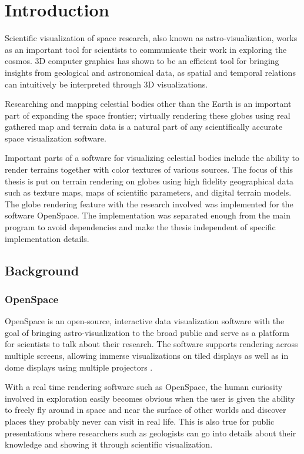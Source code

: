 \chapter{Introduction}

Scientific visualization of space research, also known as astro-visualization, works as an important tool for scientists to communicate their work in exploring the cosmos. 3D computer graphics has shown to be an efficient tool for bringing insights from geological and astronomical data, as spatial and temporal relations can intuitively be interpreted through 3D visualizations.

Researching and mapping celestial bodies other than the Earth is an important part of expanding the space frontier; virtually rendering these globes using real gathered map and terrain data is a natural part of any scientifically accurate space visualization software.

Important parts of a software for visualizing celestial bodies include the ability to render terrains together with color textures of various sources. The focus of this thesis is put on terrain rendering on globes using high fidelity geographical data such as texture maps, maps of scientific parameters, and digital terrain models. The globe rendering feature with the research involved was implemented for the software OpenSpace. The implementation was separated enough from the main program to avoid dependencies and make the thesis independent of specific implementation details. 

\section{Background}

\subsection{OpenSpace}

OpenSpace is an open-source, interactive data visualization software with the goal of bringing astro-visualization to the broad public and serve as a platform for scientists to talk about their research. The software supports rendering across multiple screens, allowing immerse visualizations on tiled displays as well as in dome displays using multiple projectors \cite{openspace}.

With a real time rendering software such as OpenSpace, the human curiosity involved in exploration easily becomes obvious when the user is given the ability to freely fly around in space and near the surface of other worlds and discover places they probably never can visit in real life. This is also true for public presentations where researchers such as geologists can go into details about their knowledge and showing it through scientific visualization.

